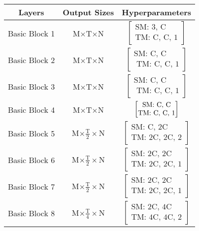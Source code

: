 \documentclass[10pt,twocolumn,letterpaper]{article}
\begin{document}
\begin{table}[!h]
	\begin{center}
		\begin{tabular}{c|c|c}
			\hline
			Layers & Output Sizes & Hyperparameters \\
			\hline
			Basic Block 1 & M$\times$T$\times$N & $\begin{bmatrix}\text{SM: 3, C} \\ \text{TM: C, C, 1}\end{bmatrix}$\\
			\hline
			Basic Block 2& M$\times$T$\times$N & $\begin{bmatrix}\text{SM: C, C} \\ \text{ TM: C, C, 1}\end{bmatrix}$\\
			\hline
			Basic Block 3& M$\times$T$\times$N & $\begin{bmatrix}\text{SM: C, C} \\ \text{ TM: C, C, 1}\end{bmatrix}$\\
			\hline
			Basic Block 4& M$\times$T$\times$N & $\rm\begin{bmatrix}\text{SM: C, C} \\ \text{TM: C, C, 1}\end{bmatrix}$\\
			\hline
			Basic Block 5& M$\times$$\frac{\text{T}}{\text{2}}\times$N & $\begin{bmatrix}\text{SM: C, 2C}\\ \text{TM: 2C, 2C, 2}\end{bmatrix}$\\
			\hline
			Basic Block 6& M$\times$$\frac{\text{T}}{\text{2}}\times$N & $\begin{bmatrix}\text{SM: 2C, 2C }\\ \text{TM: 2C, 2C, 1}\end{bmatrix}$\\
			\hline
			Basic Block 7& M$\times$$\frac{\text{T}}{\text{2}}\times$N & $\begin{bmatrix}\text{SM: 2C, 2C }\\ \text{TM: 2C, 2C, 1}\end{bmatrix}$\\
			\hline
			Basic Block 8& M$\times$$\frac{\text{T}}{\text{4}}\times$N & $\begin{bmatrix}\text{SM: 2C, 4C} \\ \text{TM: 4C, 4C, 2}\end{bmatrix}$\\

\end{tabular}
\end{center}
\end{table}
\end{document}
